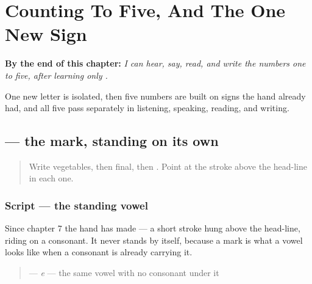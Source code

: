 
\chapter{Counting To Five, And The One New Sign}
\label{ch:mw-count-five}

\begin{chapteropening}
\textbf{By the end of this chapter:} \emph{I can hear, say, read, and write the numbers one to five, after learning only .}

One new letter is isolated, then five numbers are built on signs the hand already had, and all five pass separately in listening, speaking, reading, and writing.
\end{chapteropening}

\section[\texorpdfstring{\mw{ए} (e)}{ए (e)}]{ — the mark, standing on its own}

\label{lesson:MW-W32-e}



\begin{quote}
Write vegetables, then final, then \textbf{ }. Point at the stroke above the head-line in each one.
\end{quote}

\subsection*{Script — the standing vowel}

Since chapter 7 the hand has made \textbf{} — a short stroke hung above the head-line, riding on a consonant. It never stands by itself, because a mark is what a vowel looks like when a consonant is already carrying it.

\begin{quote}
\textbf{} — \emph{e} — the same vowel with no consonant under it
\end{quote}

